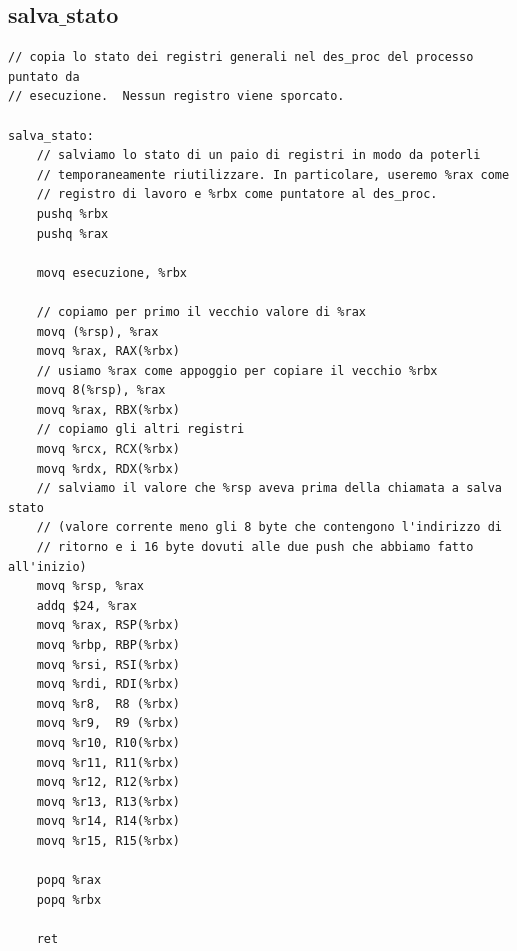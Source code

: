\documentclass[11pt]{report}
\theoremstyle{definition}
\begin{document}
\subsection{salva$\_$stato}	
\small 
\begin{verbatim}
// copia lo stato dei registri generali nel des_proc del processo puntato da
// esecuzione.  Nessun registro viene sporcato.

salva_stato:
    // salviamo lo stato di un paio di registri in modo da poterli
    // temporaneamente riutilizzare. In particolare, useremo %rax come
    // registro di lavoro e %rbx come puntatore al des_proc.
    pushq %rbx
    pushq %rax

    movq esecuzione, %rbx

    // copiamo per primo il vecchio valore di %rax
    movq (%rsp), %rax
    movq %rax, RAX(%rbx)
    // usiamo %rax come appoggio per copiare il vecchio %rbx
    movq 8(%rsp), %rax
    movq %rax, RBX(%rbx)
    // copiamo gli altri registri
    movq %rcx, RCX(%rbx)
    movq %rdx, RDX(%rbx)
    // salviamo il valore che %rsp aveva prima della chiamata a salva stato
    // (valore corrente meno gli 8 byte che contengono l'indirizzo di
    // ritorno e i 16 byte dovuti alle due push che abbiamo fatto all'inizio)
    movq %rsp, %rax
    addq $24, %rax
    movq %rax, RSP(%rbx)
    movq %rbp, RBP(%rbx)
    movq %rsi, RSI(%rbx)
    movq %rdi, RDI(%rbx)
    movq %r8,  R8 (%rbx)
    movq %r9,  R9 (%rbx)
    movq %r10, R10(%rbx)
    movq %r11, R11(%rbx)
    movq %r12, R12(%rbx)
    movq %r13, R13(%rbx)
    movq %r14, R14(%rbx)
    movq %r15, R15(%rbx)

    popq %rax
    popq %rbx

    ret
\end{verbatim}
\normalsize 
\end{document}
